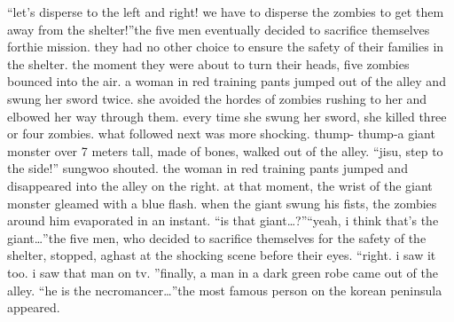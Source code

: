 “let’s disperse to the left and right! we have to disperse the zombies to get them away from the shelter!”the five men eventually decided to sacrifice themselves forthie mission.
 they had no other choice to ensure the safety of their families in the shelter.
the moment they were about to turn their heads, five zombies bounced into the air.
a woman in red training pants jumped out of the alley and swung her sword twice.
she avoided the hordes of zombies rushing to her and elbowed her way through them.
every time she swung her sword, she killed three or four zombies.
what followed next was more shocking.
thump- thump-a giant monster over 7 meters tall, made of bones, walked out of the alley.
“jisu, step to the side!” sungwoo shouted.
the woman in red training pants jumped and disappeared into the alley on the right.
 at that moment, the wrist of the giant monster gleamed with a blue flash.
when the giant swung his fists, the zombies around him evaporated in an instant.
“is that giant…?”“yeah, i think that’s the giant…”the five men, who decided to sacrifice themselves for the safety of the shelter, stopped, aghast at the shocking scene before their eyes.
“right.
 i saw it too.
 i saw that man on tv.
”finally, a man in a dark green robe came out of the alley.
“he is the necromancer…”the most famous person on the korean peninsula appeared.


 